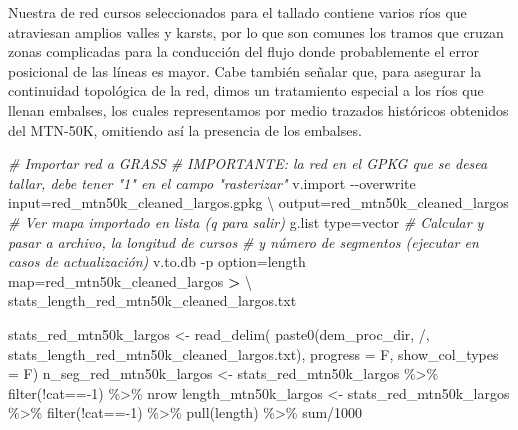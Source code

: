 \documentclass[spanish]{article}
\newenvironment{Shaded}{\begin{snugshade}}{\end{snugshade}}
\newcommand{\AttributeTok}[1]{\textcolor[rgb]{0.77,0.63,0.00}{#1}}
\newcommand{\CommentTok}[1]{\textcolor[rgb]{0.56,0.35,0.01}{\textit{#1}}}
\newcommand{\DataTypeTok}[1]{\textcolor[rgb]{0.13,0.29,0.53}{#1}}
\newcommand{\DecValTok}[1]{\textcolor[rgb]{0.00,0.00,0.81}{#1}}
\newcommand{\ExtensionTok}[1]{#1}
\newcommand{\FunctionTok}[1]{\textcolor[rgb]{0.00,0.00,0.00}{#1}}
\newcommand{\NormalTok}[1]{#1}
\newcommand{\OperatorTok}[1]{\textcolor[rgb]{0.81,0.36,0.00}{\textbf{#1}}}
\newcommand{\OtherTok}[1]{\textcolor[rgb]{0.56,0.35,0.01}{#1}}
\newcommand{\SpecialCharTok}[1]{\textcolor[rgb]{0.00,0.00,0.00}{#1}}
\newcommand{\StringTok}[1]{\textcolor[rgb]{0.31,0.60,0.02}{#1}}
\begin{document}
Nuestra de red cursos seleccionados para el tallado contiene varios ríos
que atraviesan amplios valles y karsts, por lo que son comunes los
tramos que cruzan zonas complicadas para la conducción del flujo donde
probablemente el error posicional de las líneas es mayor. Cabe también
señalar que, para asegurar la continuidad topológica de la red, dimos un
tratamiento especial a los ríos que llenan embalses, los cuales
representamos por medio trazados históricos obtenidos del MTN-50K,
omitiendo así la presencia de los embalses.

\begin{Shaded}
\begin{Highlighting}[]
\CommentTok{\# Importar red a GRASS}
\CommentTok{\# IMPORTANTE: la red en el GPKG que se desea tallar, debe tener "1" en el campo "rasterizar"}
\ExtensionTok{v.import} \AttributeTok{{-}{-}overwrite}\NormalTok{ input=red\_mtn50k\_cleaned\_largos.gpkg }\DataTypeTok{\textbackslash{}}
\NormalTok{  output=red\_mtn50k\_cleaned\_largos}
\CommentTok{\# Ver mapa importado en lista (q para salir)}
\ExtensionTok{g.list}\NormalTok{ type=vector}
\CommentTok{\# Calcular y pasar a archivo, la longitud de cursos}
\CommentTok{\# y número de segmentos (ejecutar en casos de actualización)}
\ExtensionTok{v.to.db} \AttributeTok{{-}p}\NormalTok{ option=length map=red\_mtn50k\_cleaned\_largos }\OperatorTok{\textgreater{}} \DataTypeTok{\textbackslash{}}
\NormalTok{  stats\_length\_red\_mtn50k\_cleaned\_largos.txt}
\end{Highlighting}
\end{Shaded}

\begin{Shaded}
\begin{Highlighting}[]
\NormalTok{stats\_red\_mtn50k\_largos }\OtherTok{\textless{}{-}} \FunctionTok{read\_delim}\NormalTok{(}
  \FunctionTok{paste0}\NormalTok{(dem\_proc\_dir, }\StringTok{\textquotesingle{}/\textquotesingle{}}\NormalTok{,}
         \StringTok{\textquotesingle{}stats\_length\_red\_mtn50k\_cleaned\_largos.txt\textquotesingle{}}\NormalTok{),}
  \AttributeTok{progress =}\NormalTok{ F, }\AttributeTok{show\_col\_types =}\NormalTok{ F)}
\NormalTok{n\_seg\_red\_mtn50k\_largos }\OtherTok{\textless{}{-}}\NormalTok{ stats\_red\_mtn50k\_largos }\SpecialCharTok{\%\textgreater{}\%}
  \FunctionTok{filter}\NormalTok{(}\SpecialCharTok{!}\NormalTok{cat}\SpecialCharTok{=={-}}\DecValTok{1}\NormalTok{) }\SpecialCharTok{\%\textgreater{}\%}\NormalTok{ nrow}
\NormalTok{length\_mtn50k\_largos }\OtherTok{\textless{}{-}}\NormalTok{ stats\_red\_mtn50k\_largos }\SpecialCharTok{\%\textgreater{}\%}
  \FunctionTok{filter}\NormalTok{(}\SpecialCharTok{!}\NormalTok{cat}\SpecialCharTok{=={-}}\DecValTok{1}\NormalTok{) }\SpecialCharTok{\%\textgreater{}\%} \FunctionTok{pull}\NormalTok{(length) }\SpecialCharTok{\%\textgreater{}\%}\NormalTok{ sum}\SpecialCharTok{/}\DecValTok{1000}
\end{Highlighting}
\end{Shaded}
\end{document}
